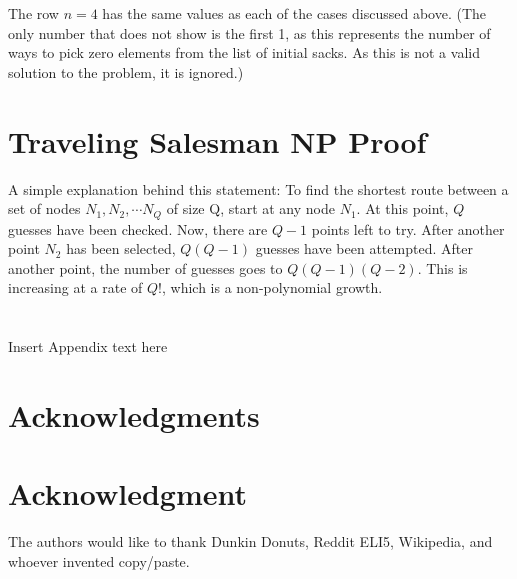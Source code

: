 \documentclass[10pt,journal,compsoc]{IEEEtran}
\begin{document}
\begin{itemize}
	The row $n=4$ has the same values as each of the cases discussed above. (The only number that does not show is the first 1, as this represents the number of ways to pick zero elements from the list of initial sacks. As this is not a valid solution to the problem, it is ignored.)
\end{itemize}

\section{Traveling Salesman NP Proof}
A simple explanation behind this statement: To find the shortest route between a set of nodes $N_1,N_2,\cdots N_Q$ of size Q, start at any node $N_1$. At this point, $Q$ guesses have been checked. Now, there are $Q-1$ points left to try. After another point $N_2$ has been selected, $Q(Q-1)$ guesses have been attempted. After another point, the number of guesses goes to $Q(Q-1)(Q-2)$. This is increasing at a rate of $Q!$, which is a non-polynomial growth. 
\section{}
Insert Appendix text here
\ifCLASSOPTIONcompsoc
  \section*{Acknowledgments}
\else
  \section*{Acknowledgment}
\fi


The authors would like to thank Dunkin Donuts, Reddit ELI5, Wikipedia, and whoever invented copy/paste. 


\ifCLASSOPTIONcaptionsoff
  \newpage
\fi




\end{document}
